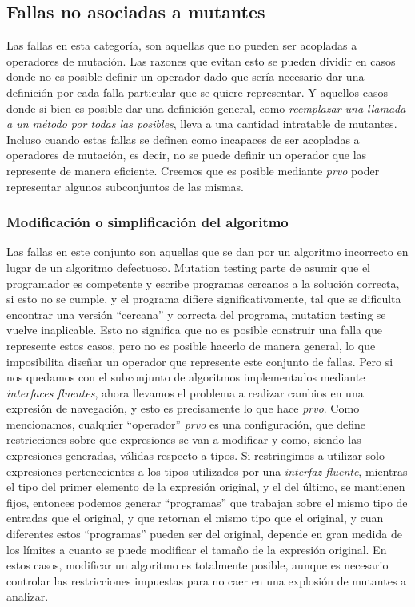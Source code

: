 \subsection{Fallas no asociadas a mutantes}

Las fallas en esta categor\'ia, son aquellas que no pueden ser acopladas a operadores de mutaci\'on. Las razones que evitan esto se pueden dividir en casos donde no es posible definir un operador dado que ser\'ia necesario dar una definici\'on por cada falla particular que se quiere representar. Y aquellos casos donde si bien es posible dar una definici\'on general, como \emph{reemplazar una llamada a un m\'etodo por todas las posibles}, lleva a una cantidad intratable de mutantes. Incluso cuando estas fallas se definen como incapaces de ser acopladas a operadores de mutaci\'on, es decir, no se puede definir un operador que las represente de manera eficiente. Creemos que es posible mediante \emph{prvo} poder representar algunos subconjuntos de las mismas.

\subsubsection{Modificaci\'on o simplificaci\'on del algoritmo}

Las fallas en este conjunto son aquellas que se dan por un algoritmo incorrecto en lugar de un algoritmo defectuoso. Mutation testing parte de asumir que el programador es competente y escribe programas cercanos a la soluci\'on correcta, si esto no se cumple, y el programa difiere significativamente, tal que se dificulta encontrar una versi\'on ``cercana'' y correcta del programa, mutation testing se vuelve inaplicable. Esto no significa que no es posible construir una falla que represente estos casos, pero no es posible hacerlo de manera general, lo que imposibilita dise\~nar un operador que represente este conjunto de fallas. Pero si nos quedamos con el subconjunto de algoritmos implementados mediante \emph{interfaces fluentes}, ahora llevamos el problema a realizar cambios en una expresi\'on de navegaci\'on, y esto es precisamente lo que hace \emph{prvo}. Como mencionamos, cualquier ``operador'' \emph{prvo} es una configuraci\'on, que define restricciones sobre que expresiones se van a modificar y como, siendo las expresiones generadas, v\'alidas respecto a tipos. Si restringimos a utilizar solo expresiones pertenecientes a los tipos utilizados por una \emph{interfaz fluente}, mientras el tipo del primer elemento de la expresi\'on original, y el del \'ultimo, se mantienen fijos, entonces podemos generar ``programas'' que trabajan sobre el mismo tipo de entradas que el original, y que retornan el mismo tipo que el original, y cuan diferentes estos ``programas'' pueden ser del original, depende en gran medida de los l\'imites a cuanto se puede modificar el tama\~no de la expresi\'on original. En estos casos, modificar un algoritmo es totalmente posible, aunque es necesario controlar las restricciones impuestas para no caer en una explosi\'on de mutantes a analizar.

